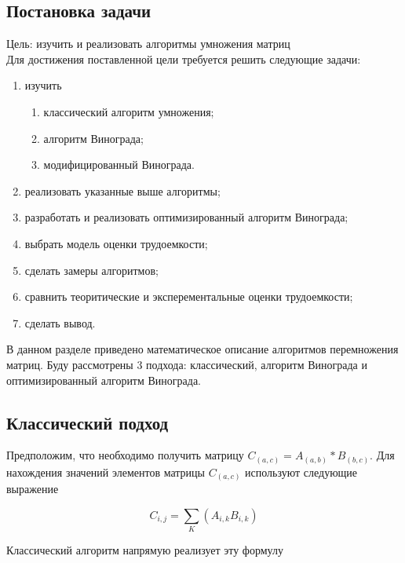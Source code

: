 \documentclass[a4paper, 14pt]{article}
\begin{document}
	\subsection{Постановка задачи}
	
	Цель: изучить и реализовать алгоритмы умножения матриц \\
	
	Для достижения поставленной цели требуется решить следующие задачи: 
	
	\begin{enumerate}
		\item изучить
		\begin{enumerate}
			\item классический алгоритм умножения;
			\item алгоритм Винограда;
			\item модифицированный Винограда.
		\end{enumerate}
		\item реализовать указанные выше алгоритмы;
		\item разработать и реализовать оптимизированный алгоритм Винограда;
		\item выбрать модель оценки трудоемкости;
		\item сделать замеры алгоритмов;
		\item сравнить теоритические и эксперементальные оценки трудоемкости;
		\item сделать вывод.
	\end{enumerate}
		
	В данном разделе приведено математическое описание алгоритмов перемножения матриц. Буду рассмотрены 3 подхода: классический, алгоритм Винограда и оптимизированный алгоритм Винограда.
	
	\subsection{Классический подход}
	
	Предположим, что необходимо получить матрицу $C_{(a,c)} = A_{(a,b)} * B_{(b,c)}$. Для нахождения значений элементов матрицы $C_{(a,c)}$ используют следующие выражение\cite{makkonell}
	
	\begin{center}
		\begin{equation}
		\label{math:1}
		C_{i,j} = \sum_{K}(A_{i, k}B_{i,k})
		\end{equation}
	\end{center}
		
	Классический алгоритм напрямую реализует эту формулу
\end{document}
